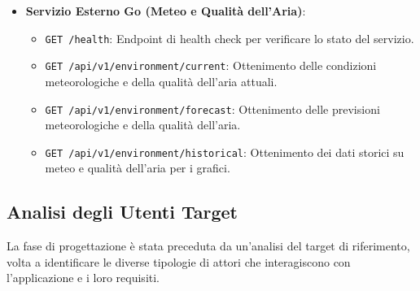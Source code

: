\documentclass[a4paper,12pt]{article}
\begin{document}
\begin{itemize}
\begin{itemize}
        \item \texttt{GET /api/v1/home/:id/usage}: Recupero delle statistiche di utilizzo dei dispositivi.
        \item \texttt{GET/POST /api/v1/home/:id/rules}: Ottenimento della lista delle regole di automazione o creazione di una nuova regola.
        \item \texttt{PUT /api/v1/home/:id/rules/order}: Aggiornamento dell'ordine di valutazione delle automazioni.
        \item \texttt{DELETE /api/v1/home/:id/rules/:ruleId}: Eliminazione di una regola di automazione.
        \item \texttt{GET /api/v1/home/:id/notifications}: Ottenimento delle notifiche relative alla casa.
        \item \texttt{GET/PUT /api/v1/home/:homeId/users/me/preferences}: Visualizzazione o aggiornamento delle preferenze (es. ricezione notifiche) dell'utente corrente.
        \item \texttt{GET /api/v1/home/:id/users}: Ottenimento della lista degli utenti associati alla casa.
        \item \texttt{PUT /api/v1/home/:id/users/:userId/role}: Modifica dei privilegi (ruolo) di un utente specifico.
    \end{itemize}
    \item \textbf{Servizio Esterno Go (Meteo e Qualità dell'Aria)}:
    \begin{itemize}
        \item \texttt{GET /health}: Endpoint di health check per verificare lo stato del servizio.
        \item \texttt{GET /api/v1/environment/current}: Ottenimento delle condizioni meteorologiche e della qualità dell'aria attuali.
        \item \texttt{GET /api/v1/environment/forecast}: Ottenimento delle previsioni meteorologiche e della qualità dell'aria.
        \item \texttt{GET /api/v1/environment/historical}: Ottenimento dei dati storici su meteo e qualità dell'aria per i grafici.
    \end{itemize}
\end{itemize}

\subsection{Analisi degli Utenti Target}
La fase di progettazione è stata preceduta da un'analisi del target di riferimento, volta a identificare le diverse tipologie di attori che interagiscono con l'applicazione e i loro requisiti.
\end{document}
